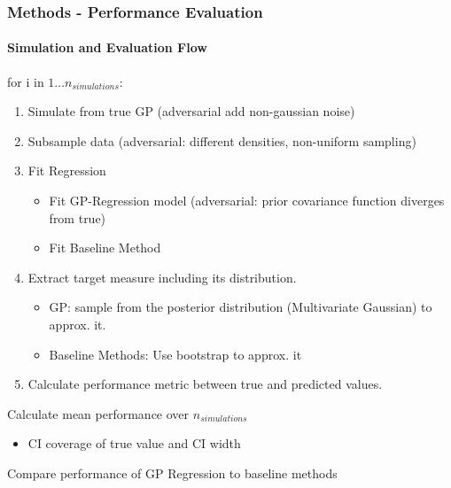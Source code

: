 \documentclass[
	8pt, %
]{beamer}
\begin{document}
\begin{frame}
	\frametitle{Methods - Performance Evaluation}
	\framesubtitle{Simulation and Evaluation Flow}
		for i in $1 \dots n_{simulations}$:
		\begin{enumerate}
			\item Simulate from true GP (adversarial add non-gaussian noise)
			\item Subsample data (adversarial: different densities, non-uniform sampling)
			\item Fit Regression
			\begin{itemize}
				\item Fit GP-Regression model (adversarial: prior covariance function diverges from true)
				\item Fit Baseline Method
			\end{itemize}
			\item Extract target measure including its distribution.
				\begin{itemize}
					\item GP: sample from the posterior distribution (Multivariate Gaussian) to approx. it.
					\item Baseline Methods: Use bootstrap to approx. it
				\end{itemize}
			\item Calculate performance metric between true and predicted values.
		\end{enumerate}

	\bigskip
	Calculate mean performance over $n_{simulations}$
		\begin{itemize}
			\item CI coverage of true value and CI width
		\end{itemize}

	\bigskip

	Compare performance of GP Regression to baseline methods

\end{frame}
%
\end{document}
